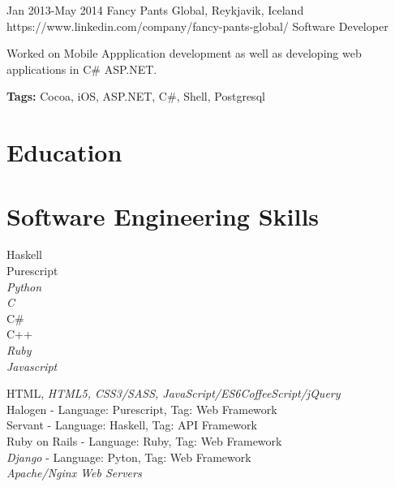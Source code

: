 \documentclass[10pt]{article} %
\begin{document}

\job
{Jan 2013-}{May 2014}
{Fancy Pants Global, Reykjavik, Iceland}
{https://www.linkedin.com/company/fancy-pants-global/}
{Software Developer}
{Worked on Mobile Appplication development as well as developing web applications in C\# ASP.NET. \\
\rule{0mm}{5mm}\textbf{Tags:} Cocoa, iOS, ASP.NET, C\#, Shell, Postgresql}


\section{Education}



\section{Software Engineering Skills}

{
Haskell\\
Purescript\\
\textit{Python}\\
\textit{C}\\
C\#\\
C++\\
\textit{Ruby}\\
\textit{Javascript}
}


{
HTML, \textit{HTML5, CSS3/SASS, JavaScript/ES6CoffeeScript/jQuery}\\
Halogen       - Language: Purescript, Tag: Web Framework\\
Servant       - Language: Haskell, Tag: API Framework\\
Ruby on Rails - Language: Ruby, Tag: Web Framework\\
\textit{Django}        - Language: Pyton, Tag: Web Framework \\
\textit{Apache/Nginx Web Servers}
}
\end{document}
